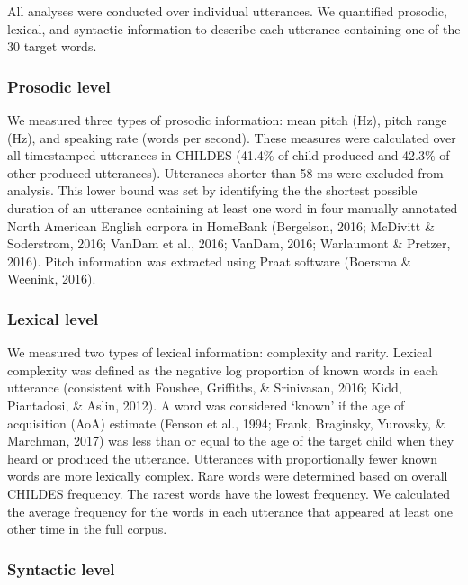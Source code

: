 \documentclass[10pt, letterpaper]{article}
\begin{document}
All analyses were conducted over individual utterances. We quantified
prosodic, lexical, and syntactic information to describe each utterance
containing one of the 30 target words.

\hypertarget{prosodic-level}{%
\subsubsection{Prosodic level}\label{prosodic-level}}

We measured three types of prosodic information: mean pitch (Hz), pitch
range (Hz), and speaking rate (words per second). These measures were
calculated over all timestamped utterances in CHILDES (41.4\% of
child-produced and 42.3\% of other-produced utterances). Utterances
shorter than 58 ms were excluded from analysis. This lower bound was set
by identifying the the shortest possible duration of an utterance
containing at least one word in four manually annotated North American
English corpora in HomeBank (Bergelson, 2016; McDivitt \& Soderstrom,
2016; VanDam et al., 2016; VanDam, 2016; Warlaumont \& Pretzer, 2016).
Pitch information was extracted using Praat software (Boersma \&
Weenink, 2016).

\hypertarget{lexical-level}{%
\subsubsection{Lexical level}\label{lexical-level}}

We measured two types of lexical information: complexity and rarity.
Lexical complexity was defined as the negative log proportion of known
words in each utterance (consistent with Foushee, Griffiths, \&
Srinivasan, 2016; Kidd, Piantadosi, \& Aslin, 2012). A word was
considered `known' if the age of acquisition (AoA) estimate (Fenson et
al., 1994; Frank, Braginsky, Yurovsky, \& Marchman, 2017) was less than
or equal to the age of the target child when they heard or produced the
utterance. Utterances with proportionally fewer known words are more
lexically complex. Rare words were determined based on overall CHILDES
frequency. The rarest words have the lowest frequency. We calculated the
average frequency for the words in each utterance that appeared at least
one other time in the full corpus.

\hypertarget{syntactic-level}{%
\subsubsection{Syntactic level}\label{syntactic-level}}
\end{document}
